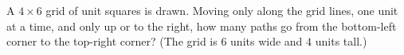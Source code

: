 A $4\times6$ grid of unit squares is drawn. Moving only along the grid lines, one unit at a time, and only up or to the right, how many paths go from the bottom-left corner to the top-right corner? (The grid is $6$ units wide and $4$ units tall.)
